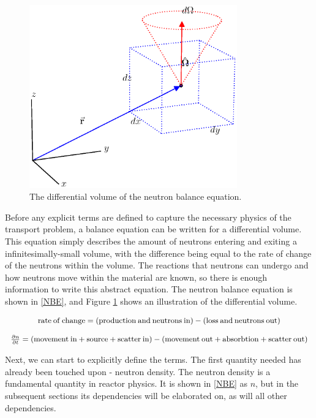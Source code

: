 \begin{figure}[h!] 
  \centering
    \includegraphics[width=0.8\textwidth,trim= 0cm 2.5cm 0cm 0cm]{graphics/diff_balance.eps} 
     \caption{The differential volume of the neutron balance equation. \label{diff_volume}}
\end{figure}

Before any explicit terms are defined to capture the necessary physics of the transport problem, a balance equation can be written for a differential volume.  This equation simply describes the amount of neutrons entering and exiting a infinitesimally-small volume, with the difference being equal to the rate of change of the neutrons within the volume.  The reactions that neutrons can undergo and how neutrons move within the material are known, so there is enough information to write this abstract equation.   The neutron balance equation is shown in \eqref{NBE}, and Figure \ref{diff_volume} shows an illustration of the differential volume.

\begin{equation}
\footnotesize
\begin{array}{c}
\mathrm{rate\:of\:change} = (\mathrm{production\:and\:neutrons\:in}) - (\mathrm{loss\:and\:neutrons\:out}) \\
\\
\frac{\partial n}{\partial t} = ( \mathrm{movement\:in} + \mathrm{source} + \mathrm{scatter\:in}) - ( \mathrm{movement\:out} + \mathrm{absorbtion} + \mathrm{scatter\:out})
\end{array}
\label{NBE}
\end{equation}

Next, we can start to explicitly define the terms.  The first quantity needed has already been touched upon - neutron density.  The neutron density is a fundamental quantity in reactor physics.  It is shown in \eqref{NBE} as $n$, but in the subsequent sections its dependencies will be elaborated on, as will all other dependencies.


